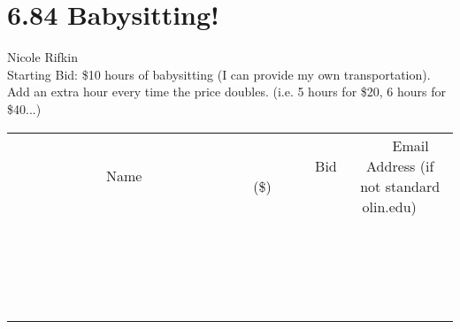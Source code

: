 \documentclass[11pt]{article}
\begin{document}
\section*{6.84 Babysitting!}
Nicole Rifkin
\\
Starting Bid: \$10
 hours of babysitting (I can provide my own transportation). Add an extra hour every time the price doubles. (i.e. 5 hours for \$20, 6 hours for \$40...)
\\[3ex]
\begin{tabular}{c c c}
~~~~~~~~~~~~~Name~~~~~~~~~~~~~ & ~~~~~~~~~Bid (\$)~~~~~~~~~  & ~~~Email Address (if not standard olin.edu)~~~\\
 & & \\
\hline
 & & \\
\hline
 & & \\
\hline
 & & \\
\hline
 & & \\
\hline
 & & \\
\hline
 & & \\
\hline
 & & \\
\hline
 & & \\
\hline
 & & \\
\hline
 & & \\
\hline
 & & \\
\hline
 & & \\
\hline
 & & \\
\hline
 & & \\
\hline
 & & \\
\hline
 & & \\
\hline
 & & \\
\hline
 & & \\
\hline
\end{tabular}
\newpage
\end{document}
